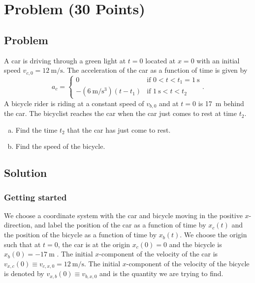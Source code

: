 \documentclass[solutions]{esg8012exam}
\date{\today }
\begin{document}
\section{Problem \thesection\space(30 Points)}
\subsection{Problem}
  A car is driving through a green light at $t = 0$ located at $x = 0$ with an initial speed $v_{c, 0} = \SI{12}{\meter\per\second}$.  The acceleration of the car as a function of time is given by
  $$a_c = \begin{cases}
            0 & \text{if }0 < t < t_1 = \SI{1}{\second} \\
            -(\SI{6}{\meter\per\second\cubed})(t - t_1) & \text{if }\SI{1}{\second} < t < t_2
          \end{cases}
  .$$
  A bicycle rider is riding at a constant speed of $v_{b,0}$ and at $t = 0$ is \SI{17}{\meter} behind the car.  The bicyclist reaches the car when the car just comes to rest at time $t_2$.

  \begin{enumerate}[(a)]
    \item Find the time $t_2$ that the car has just come to rest.
    \item Find the speed of the bicycle.
  \end{enumerate}
\subsection{Solution}
  \subsubsection{Getting started}
    We choose a coordinate system with the car and bicycle moving in the positive $x$-direction, and label the position of the car as a function of time by $x_c(t)$ and the position of the bicycle as a function of time by $x_b(t)$.  We choose the origin such that at $t = 0$, the car is at the origin $x_c(0) = 0$ and the bicycle is $x_b(0) = -\SI{17}{\meter}$
.  The initial $x$-component of the velocity of the car is $v_{x,c}(0) \equiv v_{c,x,0} = \SI{12}{\meter\per\second}$.  The initial $x$-component of the velocity of the bicycle is denoted by $v_{x,b}(0) \equiv v_{b,x,0}$ and is the quantity we are trying to find.
\end{document}
